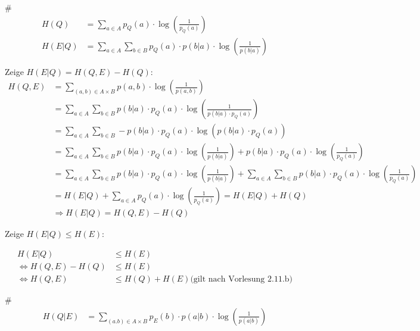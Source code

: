 \begin{myList}
#
\begin{align*}
	H(Q) &= \sum\limits_{a \in A} p_Q(a) \cdot \log \left( \frac{1}{p_Q(a)} \right) \\
	H(E|Q) &= \sum\limits_{a \in A} \sum\limits_{b \in B} p_Q(a) \cdot p(b|a) \cdot \log \left( \frac{1}{p(b|a)}\right) 
\end{align*}

Zeige $H(E|Q) = H(Q,E) - H(Q)$:
\begin{align*}
	H(Q,E) &= \sum\limits_{(a,b) \in A\times B} p(a,b) \cdot \log\left(\frac{1}{p(a,b)}\right) \\
	&= \sum\limits_{a \in A} \sum\limits_{b \in B} p(b|a) \cdot p_Q(a) \cdot \log \left( \frac{1}{p(b|a) \cdot p_Q(a)} \right) \\
	&= \sum\limits_{a \in A} \sum\limits_{b \in B} -p(b|a) \cdot p_Q(a) \cdot \log \left(p(b|a) \cdot p_Q(a) \right) \\
	&= \sum\limits_{a \in A} \sum\limits_{b \in B} p(b|a) \cdot p_Q(a) \cdot \log \left(\frac{1}{p(b|a)} \right) + p(b|a) \cdot p_Q(a) \cdot \log \left(\frac{1}{p_Q(a)} \right) \\
	&= \sum\limits_{a \in A} \sum\limits_{b \in B} p(b|a) \cdot p_Q(a) \cdot \log \left(\frac{1}{p(b|a)} \right) + \sum\limits_{a \in A} \sum\limits_{b \in B} p(b|a) \cdot p_Q(a) \cdot \log \left(\frac{1}{p_Q(a)} \right) \\
	&= H(E|Q) + \sum\limits_{a \in A}  p_Q(a) \cdot \log \left(\frac{1}{p_Q(a)} \right) = H(E|Q) + H(Q)\\
	&\Rightarrow H(E|Q) = H(Q,E) - H(Q)
\end{align*}

Zeige $H(E|Q) \leq H(E)$:

\begin{align*}
	 H(E|Q) &\leq H(E) \\
	\Leftrightarrow H(Q,E) - H(Q) &\leq H(E) \\
	\Leftrightarrow H(Q,E) &\leq H(Q) + H(E) \text{(gilt nach Vorlesung 2.11.b)}
\end{align*}

#
\begin{align*}
	H(Q|E) &= \sum\limits_{(a.b) \in A \times B} p_E(b)\cdot p(a|b) \cdot \log \left( \frac{1}{p(a|b)}\right)
\end{align*}


\end{myList}
